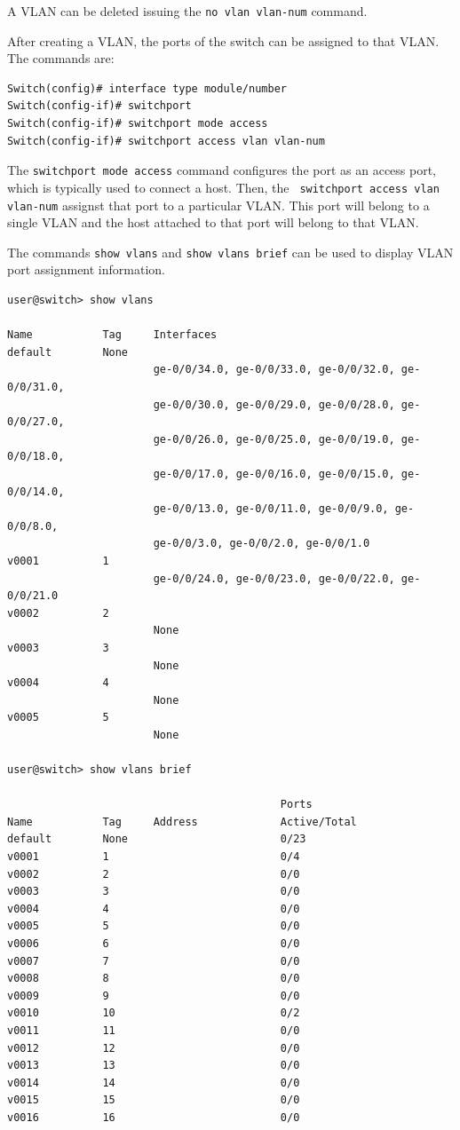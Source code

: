 A VLAN can be deleted issuing the \texttt{no vlan vlan-num} command.

After creating a VLAN, the ports of the switch can be assigned to that VLAN.
The commands are:
\begin{lstlisting}
Switch(config)# interface type module/number
Switch(config-if)# switchport
Switch(config-if)# switchport mode access
Switch(config-if)# switchport access vlan vlan-num
\end{lstlisting}

The \texttt{switchport mode access} command configures the port as an access port, which is typically used to connect a host.
Then, the \texttt{ switchport access vlan vlan-num} assignst that port to a particular VLAN.
This port will belong to a single VLAN and the host attached to that port will belong to that VLAN.

The commands \texttt{show vlans} and \texttt{show vlans brief} can be used to display VLAN port assignment information.

\begin{lstlisting}
user@switch> show vlans

Name           Tag     Interfaces
default        None
                       ge-0/0/34.0, ge-0/0/33.0, ge-0/0/32.0, ge-0/0/31.0,
                       ge-0/0/30.0, ge-0/0/29.0, ge-0/0/28.0, ge-0/0/27.0,
                       ge-0/0/26.0, ge-0/0/25.0, ge-0/0/19.0, ge-0/0/18.0,
                       ge-0/0/17.0, ge-0/0/16.0, ge-0/0/15.0, ge-0/0/14.0,
                       ge-0/0/13.0, ge-0/0/11.0, ge-0/0/9.0, ge-0/0/8.0,
                       ge-0/0/3.0, ge-0/0/2.0, ge-0/0/1.0
v0001          1
                       ge-0/0/24.0, ge-0/0/23.0, ge-0/0/22.0, ge-0/0/21.0
v0002          2
                       None
v0003          3
                       None
v0004          4
                       None
v0005          5
                       None

user@switch> show vlans brief

                                           Ports
Name           Tag     Address             Active/Total
default        None                        0/23
v0001          1                           0/4
v0002          2                           0/0
v0003          3                           0/0
v0004          4                           0/0
v0005          5                           0/0
v0006          6                           0/0
v0007          7                           0/0
v0008          8                           0/0
v0009          9                           0/0
v0010          10                          0/2
v0011          11                          0/0
v0012          12                          0/0
v0013          13                          0/0
v0014          14                          0/0
v0015          15                          0/0
v0016          16                          0/0

\end{lstlisting}

